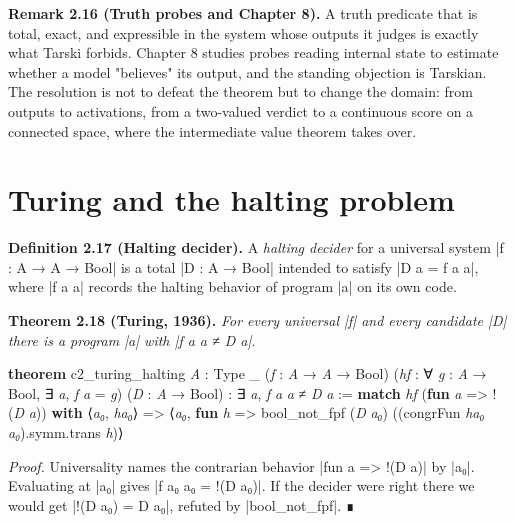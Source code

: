 \documentclass{memoir}
\begin{document}
\textbf{Remark 2.16 (Truth probes and Chapter 8).} A truth predicate that is total, exact,
and expressible in the system whose outputs it judges is exactly what Tarski
forbids. Chapter 8 studies probes reading internal state to estimate whether a
model "believes" its output, and the standing objection is Tarskian. The
resolution is not to defeat the theorem but to change the domain: from outputs
to activations, from a two-valued verdict to a continuous score on a connected
space, where the intermediate value theorem takes over.



\section{Turing and the halting problem}\label{Two--Schemas--of--Impossibility-005F-005F-005F--Machine--Checked--Limits--of--Trustworthy--Machine--Learning-005F-005F-005F--and--Why--They--Tighten--with--Capability----The--Classical--Limits----Turing--and--the--halting--problem}

\textbf{Definition 2.17 (Halting decider).} A \emph{halting decider} for a universal system
\LeanVerb|f : A → A → Bool| is a total \LeanVerb|D : A → Bool| intended to satisfy \LeanVerb|D a = f a a|,
where \LeanVerb|f a a| records the halting behavior of program \LeanVerb|a| on its own code.

\textbf{Theorem 2.18 (Turing, 1936).} \emph{For every universal \LeanVerb|f| and every candidate \LeanVerb|D|
there is a program \LeanVerb|a| with \LeanVerb|f a a ≠ D a|.}

\begin{LeanVerbatim}
\textbf{theorem} c2_turing_halting \textit{A} : Type _ (\textit{f} : \textit{A} → \textit{A} → Bool)
    (\textit{hf} : ∀ \textit{g} : \textit{A} → Bool, ∃ \textit{a}, \textit{f} \textit{a} = \textit{g}) (\textit{D} : \textit{A} → Bool) :
    ∃ \textit{a}, \textit{f} \textit{a} \textit{a} ≠ \textit{D} \textit{a} :=
  \textbf{match} \textit{hf} (\textbf{fun} \textit{a} => !(\textit{D} \textit{a})) \textbf{with}
   ⟨\textit{a₀}, \textit{ha₀}⟩ =>
    ⟨\textit{a₀}, \textbf{fun} \textit{h} =>
      bool_not_fpf (\textit{D} \textit{a₀}) ((congrFun \textit{ha₀} \textit{a₀}).symm.trans \textit{h})⟩

\end{LeanVerbatim}


\emph{Proof.} Universality names the contrarian behavior \LeanVerb|fun a => !(D a)| by \LeanVerb|a₀|.
Evaluating at \LeanVerb|a₀| gives \LeanVerb|f a₀ a₀ = !(D a₀)|. If the decider were right there we
would get \LeanVerb|!(D a₀) = D a₀|, refuted by \LeanVerb|bool_not_fpf|. ∎
\end{document}
